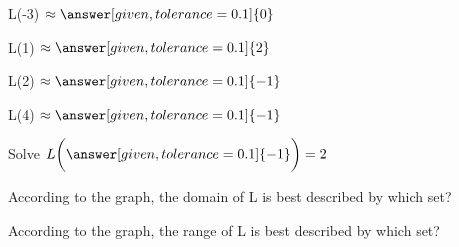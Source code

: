 \documentclass{ximera}
\begin{document}
\begin{exercise}
L(-3)   $\approx \answer[given,tolerance=0.1]{0}$
\end{exercise}


\begin{exercise}
L(1)   $\approx \answer[given,tolerance=0.1]{2}$
\end{exercise}


\begin{exercise}
L(2)   $\approx \answer[given,tolerance=0.1]{-1}$
\end{exercise}


\begin{exercise}
L(4)   $\approx \answer[given,tolerance=0.1]{-1}$
\end{exercise}



\begin{exercise}
Solve   $ L\bigg( \answer[given,tolerance=0.1]{-1} \bigg) = 2$
\end{exercise}







\begin{exercise}
According to the graph, the domain of L is best described by which set?
\begin{multipleChoice}
\choice{$[-2, 3.5)$}
\choice[correct]{$(-\infy, \infty)$}
\choice{$[-2, 3.5]$}
\end{multipleChoice}
\end{exercise}

\begin{exercise}
According to the graph, the range of L is best described by which set?
\begin{multipleChoice}
\choice{$[-2.4, 0.5] \cup [1, 4)$}
\choice[correct]{$(-\infty, \infty)$}
\choice{$[-2.4, 0.5] \cup [1, 4) \cup \{ 2 \}$}
\end{multipleChoice}
\end{exercise}
\end{document}
